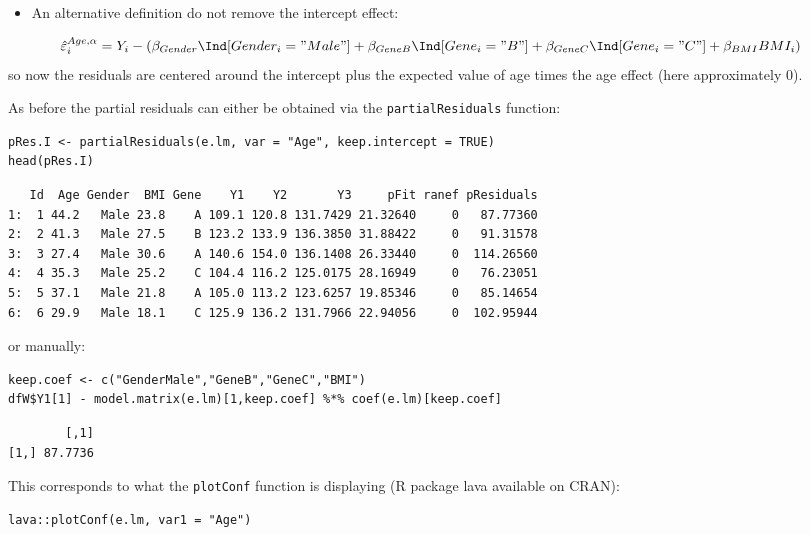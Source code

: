 \documentclass[12pt]{article}
\begin{document}
\begin{itemize}
\item An alternative definition do not remove the intercept effect:
\end{itemize}
\begin{align*}
\hat{\varepsilon}^{Age,\alpha}_i &= Y_i - \left(\beta_{Gender} \Ind[Gender_i="Male"] + \beta_{GeneB} \Ind[Gene_i="B"] + \beta_{GeneC} \Ind[Gene_i="C"] + \beta_{BMI} BMI_i \right)
\end{align*}
so now the residuals are centered around the intercept plus the
expected value of age times the age effect (here approximately 0). 

\clearpage

As before the partial residuals can either be obtained via the
\texttt{partialResiduals} function:
\lstset{language=r,label= ,caption= ,captionpos=b,numbers=none}
\begin{lstlisting}
pRes.I <- partialResiduals(e.lm, var = "Age", keep.intercept = TRUE)
head(pRes.I)
\end{lstlisting}

\begin{verbatim}
   Id  Age Gender  BMI Gene    Y1    Y2       Y3     pFit ranef pResiduals
1:  1 44.2   Male 23.8    A 109.1 120.8 131.7429 21.32640     0   87.77360
2:  2 41.3   Male 27.5    B 123.2 133.9 136.3850 31.88422     0   91.31578
3:  3 27.4   Male 30.6    A 140.6 154.0 136.1408 26.33440     0  114.26560
4:  4 35.3   Male 25.2    C 104.4 116.2 125.0175 28.16949     0   76.23051
5:  5 37.1   Male 21.8    A 105.0 113.2 123.6257 19.85346     0   85.14654
6:  6 29.9   Male 18.1    C 125.9 136.2 131.7966 22.94056     0  102.95944
\end{verbatim}

or manually: 
\lstset{language=r,label= ,caption= ,captionpos=b,numbers=none}
\begin{lstlisting}
keep.coef <- c("GenderMale","GeneB","GeneC","BMI")
dfW$Y1[1] - model.matrix(e.lm)[1,keep.coef] %*% coef(e.lm)[keep.coef]
\end{lstlisting}

\begin{verbatim}
        [,1]
[1,] 87.7736
\end{verbatim}

This corresponds to what the \texttt{plotConf} function is displaying (R
package lava available on CRAN):
\lstset{language=r,label= ,caption= ,captionpos=b,numbers=none}
\begin{lstlisting}
lava::plotConf(e.lm, var1 = "Age")
\end{lstlisting}
\end{document}
